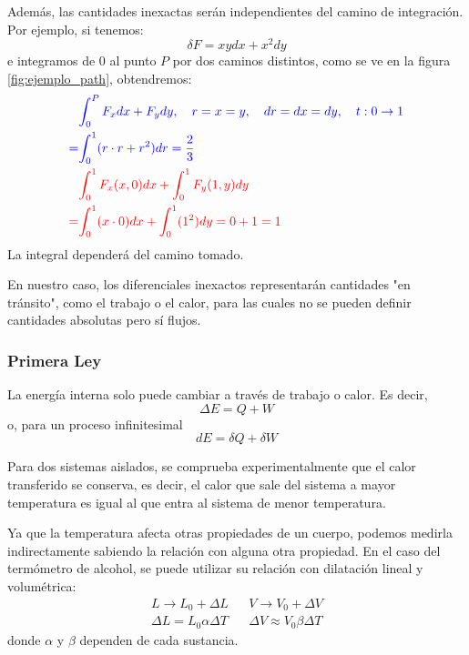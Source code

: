 \documentclass[]{article}
\numberwithin{equation}{section}
\newcommand{\0}{\textcolor{gray}{0}}
\begin{document}
Además, las cantidades inexactas serán independientes del camino de integración. Por ejemplo, si tenemos:
\begin{equation*}
	\delta F = xy dx + x^2 dy
\end{equation*}
e integramos de 0 al punto $P$ por dos caminos distintos, como se ve en la figura \ref{fig:ejemplo_path}, obtendremos:
\begin{align*}
	&\textcolor{blue}{\int_{0}^{P}F_x dx + F_y dy,\ \ \ r=x=y,\ \ \ dr=dx=dy,\ \ \ t:0 \rightarrow 1}\\
	\textcolor{blue}{=}&\textcolor{blue}{\int_{0}^{1}(r\cdot r+r^2)dr = \frac{2}{3}}\\
	&\textcolor{red}{\int_{0}^{1}F_x(x,0) dx + \int_{0}^{1} F_y(1,y) dy}\\
	\textcolor{red}{=}&\textcolor{red}{\int_{0}^{1}(x\cdot 0)dx + \int_{0}^{1}(1^2)dy = 0+1 = 1}
\end{align*}
La integral dependerá del camino tomado.

En nuestro caso, los diferenciales inexactos representarán cantidades "en tránsito", como el trabajo o el calor, para las cuales no se pueden definir cantidades absolutas pero sí flujos.

\subsubsection{Primera Ley}

La energía interna solo puede cambiar a través de trabajo o calor. Es decir,
\begin{equation}
	\Delta E = Q+W
\end{equation}
o, para un proceso infinitesimal
\begin{equation}
	dE = \delta Q + \delta W
\end{equation}

Para dos sistemas aislados, se comprueba experimentalmente que el calor transferido se conserva, es decir, el calor que sale del sistema a mayor temperatura es igual al que entra al sistema de menor temperatura.

Ya que la temperatura afecta otras propiedades de un cuerpo, podemos medirla indirectamente sabiendo la relación con alguna otra propiedad. En el caso del termómetro de alcohol, se puede utilizar su relación con dilatación lineal y volumétrica:
\begin{equation}
	\begin{matrix}
		L\rightarrow L_0+\Delta L & & V\rightarrow V_0+\Delta V\\
		\Delta L = L_0\alpha\Delta T & & \Delta V \approx V_0\beta\Delta T 
	\end{matrix}
\end{equation}
donde $\alpha$ y $\beta$ dependen de cada sustancia.
\end{document}

